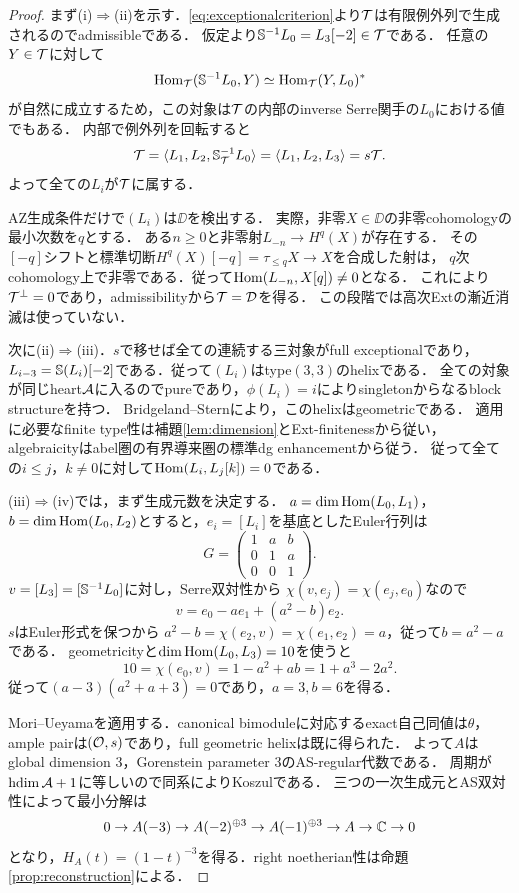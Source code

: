 \documentclass[11pt,a4paper]{ltjsarticle}
\begin{document}
\begin{proof}
まず(i)$\Rightarrow$(ii)を示す．\eqref{eq:exceptionalcriterion}より$\mathcal T$は有限例外列で生成されるのでadmissibleである．
仮定より$\mathbb S^{-1}L_0=L_3[-2]\in\mathcal T$である．
任意の$Y\in\mathcal T$に対して
\[
 \operatorname{Hom}_{\mathcal T}(\mathbb S^{-1}L_0,Y)\simeq\operatorname{Hom}_{\mathcal T}(Y,L_0)^*
\]
が自然に成立するため，この対象は$\mathcal T$の内部のinverse Serre関手の$L_0$における値でもある．
内部で例外列を回転すると
\begin{equation}\label{eq:rotation}
 \mathcal T=\langle L_1,L_2,\mathbb S_{\mathcal T}^{-1}L_0\rangle
 =\langle L_1,L_2,L_3\rangle=s\mathcal T.
\end{equation}
よって全ての$L_i$が$\mathcal T$に属する．

AZ生成条件だけで$(L_i)$は$\DD$を検出する．
実際，非零$X\in\DD$の非零cohomologyの最小次数を$q$とする．
ある$n\geq0$と非零射$L_{-n}\to H^q(X)$が存在する．
その$[-q]$シフトと標準切断$H^q(X)[-q]=\tau_{\leq q}X\to X$を合成した射は，
$q$次cohomology上で非零である．従って$\operatorname{Hom}(L_{-n},X[q])\ne0$となる．
これにより$\mathcal T^\perp=0$であり，admissibilityから$\mathcal T=\mathcal D$を得る．
この段階では高次Extの漸近消滅は使っていない．

次に(ii)$\Rightarrow$(iii)．$s$で移せば全ての連続する三対象がfull exceptionalであり，
$L_{i-3}=\mathbb S(L_i)[-2]$である．従って$(L_i)$はtype$(3,3)$のhelixである．
全ての対象が同じheart$\mathcal A$に入るのでpureであり，$\phi(L_i)=i$によりsingletonからなるblock structureを持つ．
Bridgeland--Stern\cite[Definition 4.10, Theorem 5.3(ii)]{BS}により，このhelixはgeometricである．
適用に必要なfinite type性は補題\ref{lem:dimension}とExt-finitenessから従い，
algebraicityはabel圏の有界導来圏の標準dg enhancementから従う．
従って全ての$i\leq j$，$k\ne0$に対して$\operatorname{Hom}(L_i,L_j[k])=0$である．

(iii)$\Rightarrow$(iv)では，まず生成元数を決定する．
$a=\dim\operatorname{Hom}(L_0,L_1)$，$b=\dim\operatorname{Hom}(L_0,L_2)$とすると，$e_i=[L_i]$を基底としたEuler行列は
\[
 G=\begin{pmatrix}1&a&b\\0&1&a\\0&0&1\end{pmatrix}.
\]
$v=[L_3]=[\mathbb S^{-1}L_0]$に対し，Serre双対性から
$\chi(v,e_j)=\chi(e_j,e_0)$なので
\[
 v=e_0-ae_1+(a^2-b)e_2.
\]
$s$はEuler形式を保つから
$a^2-b=\chi(e_2,v)=\chi(e_1,e_2)=a$，従って$b=a^2-a$である．
geometricityと$\dim\operatorname{Hom}(L_0,L_3)=10$を使うと
\[
 10=\chi(e_0,v)=1-a^2+ab=1+a^3-2a^2.
\]
従って$(a-3)(a^2+a+3)=0$であり，$a=3,b=6$を得る．

Mori--Ueyama\cite[Corollary 4.2]{MU}を適用する．canonical bimoduleに対応するexact自己同値は$\theta$，
ample pairは$(\mathcal O,s)$であり，full geometric helixは既に得られた．
よって$A$はglobal dimension 3，Gorenstein parameter 3のAS-regular代数である．
周期が$\operatorname{hdim}\mathcal A+1$に等しいので同系によりKoszulである．
三つの一次生成元とAS双対性によって最小分解は
\begin{equation}\label{eq:koszul}
 0\to A(-3)\to A(-2)^{\oplus3}\to A(-1)^{\oplus3}
 \to A\to\mathbb C\to0
\end{equation}
となり，$H_A(t)=(1-t)^{-3}$を得る．right noetherian性は命題\ref{prop:reconstruction}による．


\end{proof}
\end{document}
